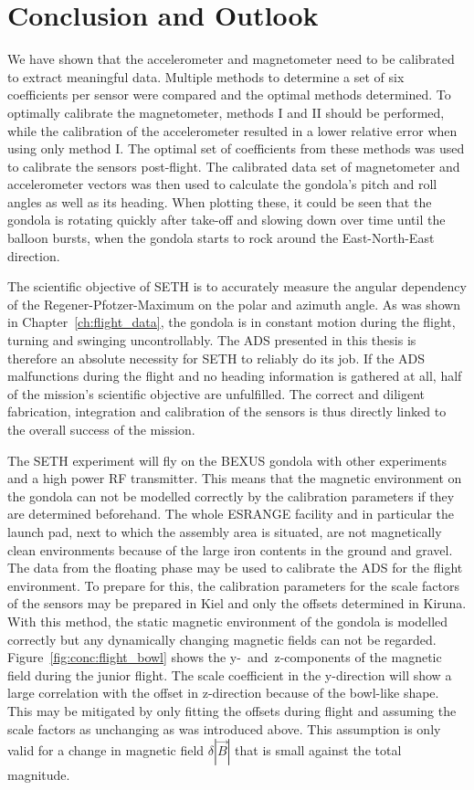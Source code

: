 \chapter{Conclusion and Outlook\label{ch:conclusion_outlook}}
We have shown that the accelerometer and magnetometer need to be calibrated to extract meaningful data. Multiple methods to determine a set of six coefficients per sensor were compared and the optimal methods determined. To optimally calibrate the magnetometer, methods I and II should be performed, while the calibration of the accelerometer resulted in a lower relative error when using only method I. The optimal set of coefficients from these methods was used to calibrate the sensors post-flight. The calibrated data set of magnetometer and accelerometer vectors was then used to calculate the gondola's pitch and roll angles as well as its heading. When plotting these, it could be seen that the gondola is rotating quickly after take-off and slowing down over time until the balloon bursts, when the gondola starts to rock around the East-North-East direction.

The scientific objective of \ac{SETH} is to accurately measure the angular dependency of the Regener-Pfotzer-Maximum on the polar and azimuth angle. As was shown in Chapter~\ref{ch:flight_data}, the gondola is in constant motion during the flight, turning and swinging uncontrollably. The \ac{ADS} presented in this thesis is therefore an absolute necessity for \ac{SETH} to reliably do its job. If the \ac{ADS} malfunctions during the flight and no heading information is gathered at all, half of the mission's scientific objective are unfulfilled. The correct and diligent fabrication, integration and calibration of the sensors is thus directly linked to the overall success of the mission.
 
The \ac{SETH} experiment will fly on the \ac{BEXUS} gondola with other experiments and a high power \ac{RF} transmitter. This means that the magnetic environment on the gondola can not be modelled correctly by the calibration parameters if they are determined beforehand. The whole \ac{ESRANGE} facility and in particular the launch pad, next to which the assembly area is situated, are not magnetically clean environments because of the large iron contents in the ground and gravel. The data from the floating phase may be used to calibrate the \ac{ADS} for the flight environment. To prepare for this, the calibration parameters for the scale factors of the sensors may be prepared in Kiel and only the offsets determined in Kiruna. With this method, the static magnetic environment of the gondola is modelled correctly but any dynamically changing magnetic fields can not be regarded. Figure~\ref{fig:conc:flight_bowl} shows the y-~and~z-components of the magnetic field during the junior flight. The scale coefficient in the y-direction will show a large correlation with the offset in z-direction because of the bowl-like shape. This may be mitigated by only fitting the offsets during flight and assuming the scale factors as unchanging as was introduced above. This assumption is only valid for a change in magnetic field $\delta |\vec{B}|$ that is small against the total magnitude.

